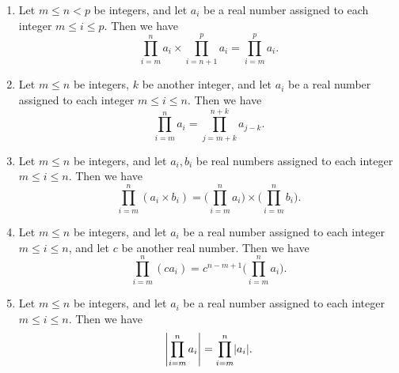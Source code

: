 \begin{additional corollary}\label{ac 7.1.2}
\mbox{}
\begin{enumerate}
    \item Let \(m \leq n < p\) be integers, and let \(a_i\) be a real number assigned to each integer \(m \leq i \leq p\).
          Then we have
          \[
              \prod_{i = m}^n a_i \times \prod_{i = n + 1}^p a_i = \prod_{i = m}^p a_i.
          \]
    \item Let \(m \leq n\) be integers, \(k\) be another integer, and let \(a_i\) be a real number assigned to each integer \(m \leq i \leq n\).
          Then we have
          \[
              \prod_{i = m}^n a_i = \prod_{j = m + k}^{n + k} a_{j - k}.
          \]
    \item Let \(m \leq n\) be integers, and let \(a_i, b_i\) be real numbers assigned to each integer \(m \leq i \leq n\).
          Then we have
          \[
              \prod_{i = m}^n (a_i \times b_i) = \Bigg(\prod_{i = m}^n a_i\Bigg) \times \Bigg(\prod_{i = m}^n b_i\Bigg).
          \]
    \item Let \(m \leq n\) be integers, and let \(a_i\) be a real number assigned to each integer \(m \leq i \leq n\), and let \(c\) be another real number.
          Then we have
          \[
              \prod_{i = m}^n (ca_i) = c^{n - m + 1} \Bigg(\prod_{i = m}^n a_i\Bigg).
          \]
    \item Let \(m \leq n\) be integers, and let \(a_i\) be a real number assigned to each integer \(m \leq i \leq n\).
          Then we have
          \[
              \abs*{\prod_{i = m}^n a_i} = \prod_{i = m}^n \abs*{a_i}.
          \]
\end{enumerate}
\end{additional corollary}

